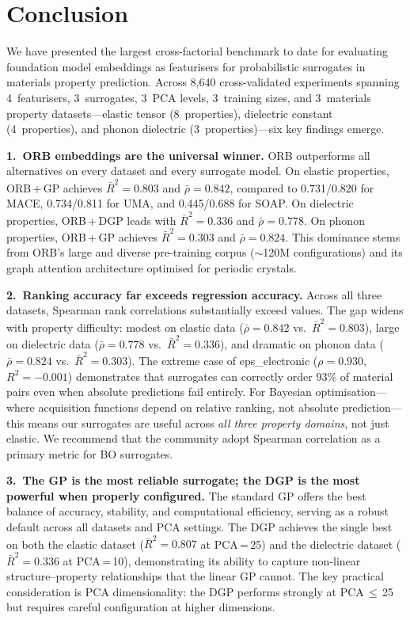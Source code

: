 \section{Conclusion}
\label{sec:conclusion}

We have presented the largest cross-factorial benchmark to date for evaluating foundation model embeddings as featurisers for probabilistic surrogates in materials property prediction.
Across 8{,}640 cross-validated experiments spanning 4~featurisers, 3~surrogates, 3~PCA levels, 3~training sizes, and 3~materials property datasets---elastic tensor (8~properties), dielectric constant (4~properties), and phonon dielectric (3~properties)---six key findings emerge.

\textbf{1.\ ORB embeddings are the universal winner.}
ORB outperforms all alternatives on every dataset and every surrogate model.
On elastic properties, ORB\,+\,GP achieves $\bar{R}^2 = 0.803$ and $\bar{\rho} = 0.842$, compared to 0.731/0.820 for MACE, 0.734/0.811 for UMA, and 0.445/0.688 for SOAP.
On dielectric properties, ORB\,+\,DGP leads with $\bar{R}^2 = 0.336$ and $\bar{\rho} = 0.778$.
On phonon properties, ORB\,+\,GP achieves $\bar{R}^2 = 0.303$ and $\bar{\rho} = 0.824$.
This dominance stems from ORB's large and diverse pre-training corpus ($\sim$120M configurations) and its graph attention architecture optimised for periodic crystals.

\textbf{2.\ Ranking accuracy far exceeds regression accuracy.}
Across all three datasets, Spearman rank correlations substantially exceed \Rtwo{} values.
The gap widens with property difficulty: modest on elastic data ($\bar{\rho} = 0.842$ vs.\ $\bar{R}^2 = 0.803$), large on dielectric data ($\bar{\rho} = 0.778$ vs.\ $\bar{R}^2 = 0.336$), and dramatic on phonon data ($\bar{\rho} = 0.824$ vs.\ $\bar{R}^2 = 0.303$).
The extreme case of eps\_electronic ($\rho = 0.930$, $R^2 = -0.001$) demonstrates that surrogates can correctly order 93\% of material pairs even when absolute predictions fail entirely.
For Bayesian optimisation---where acquisition functions depend on relative ranking, not absolute prediction---this means our surrogates are useful across \emph{all three property domains}, not just elastic.
We recommend that the community adopt Spearman correlation as a primary metric for BO surrogates.

\textbf{3.\ The GP is the most reliable surrogate; the DGP is the most powerful when properly configured.}
The standard GP offers the best balance of accuracy, stability, and computational efficiency, serving as a robust default across all datasets and PCA settings.
The DGP achieves the single best \Rtwo{} on both the elastic dataset ($\bar{R}^2 = 0.807$ at PCA\,=\,25) and the dielectric dataset ($\bar{R}^2 = 0.336$ at PCA\,=\,10), demonstrating its ability to capture non-linear structure--property relationships that the linear GP cannot.
The key practical consideration is PCA dimensionality: the DGP performs strongly at PCA\,$\leq$\,25 but requires careful configuration at higher dimensions.

